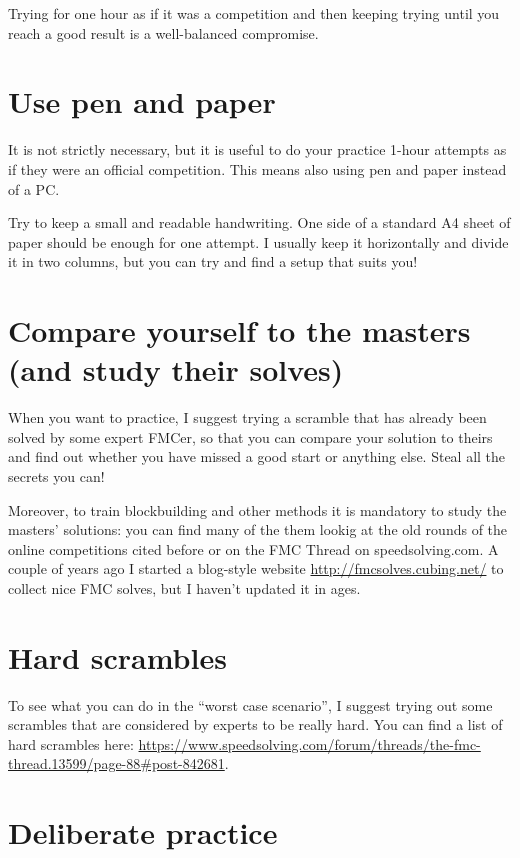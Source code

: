 \documentclass[11pt,a4paper]{book}
\begin{document}
Trying for one hour as if it was a competition and then keeping trying until you reach a good result is a well-balanced compromise.

\section{Use pen and paper}

It is not strictly necessary, but it is useful to do your practice 1-hour attempts as if they were an official competition. This means also using pen and paper instead of a PC.

Try to keep a small and readable handwriting. One side of a standard A4 sheet of paper should be enough for one attempt. I usually keep it horizontally and divide it in two columns, but you can try and find a setup that suits you!

\section{Compare yourself to the masters (and study their solves)}

When you want to practice, I suggest trying a scramble that has already been solved by some expert FMCer, so that you can compare your solution to theirs and find out whether you have missed a good start or anything else. Steal all the secrets you can!

Moreover, to train blockbuilding and other methods it is mandatory to study the masters' solutions: you can find many of the them lookig at the old rounds of the online competitions cited before or on the FMC Thread on speedsolving.com. A couple of years ago I started a blog-style website \url{http://fmcsolves.cubing.net/} to collect nice FMC solves, but I haven't updated it in ages.

\section{Hard scrambles}

To see what you can do in the ``worst case scenario'', I suggest trying out some scrambles that are considered by experts to be really hard. You can find a list of hard scrambles here: \url{https://www.speedsolving.com/forum/threads/the-fmc-thread.13599/page-88\#post-842681}.

\section{Deliberate practice}
\end{document}
